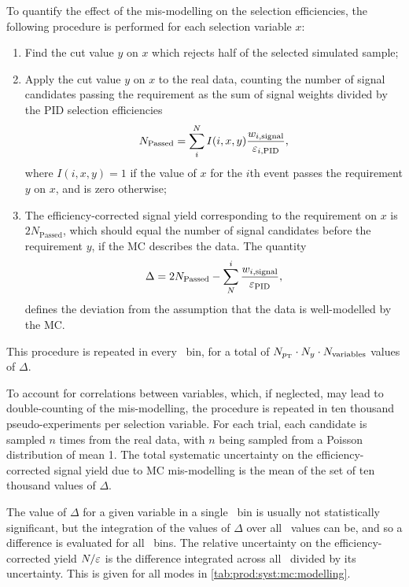 To quantify the effect of the mis-modelling on the selection efficiencies, the
following procedure is performed for each selection variable $x$:
\begin{enumerate}
  \item Find the cut value $y$ on $x$ which rejects half of the selected
    simulated sample;
  \item Apply the cut value $y$ on $x$ to the real data, counting the number of
    signal candidates passing the requirement as the sum of signal weights
    divided by the \ac{PID} selection efficiencies
    \begin{equation}
      N_{\text{Passed}} = \sum_{i}^{N} I(i, x, y) \frac{%
        w_{i,\text{signal}}
      }{%
        \eff_{i,\text{PID}}
      },
    \end{equation}
    where $I(i, x, y) = 1$ if the value of $x$ for the $i$th event passes the
    requirement $y$ on $x$, and is zero otherwise;
  \item The efficiency-corrected signal yield corresponding to the requirement
    on $x$ is $2N_{\text{Passed}}$, which should equal the number of signal
    candidates before the requirement $y$, if the \ac{MC} describes the data.
    The quantity
    \begin{equation}
      \Delta = 2N_{\text{Passed}} - \sum_{N}^{i} \frac{w_{i,\text{signal}}}{\varepsilon_{\textnormal{PID}}},
      \label{eqn:prod:syst:mc:eff_diff}
    \end{equation}
    defines the deviation from the assumption that the data is well-modelled by
    the \ac{MC}.
\end{enumerate}
This procedure is repeated in every \pTy\ bin, for a total of $N_{p_{\textnormal{T}}} \cdot
N_{y} \cdot N_{\text{variables}}$ values of $\Delta$.

To account for correlations between variables, which, if neglected, may lead to
double-counting of the mis-modelling, the procedure is repeated in ten thousand
pseudo-experiments per selection variable.
For each trial, each candidate is sampled $n$ times from the real data, with
$n$ being sampled from a Poisson distribution of mean 1.
The total systematic uncertainty on the efficiency-corrected signal yield due
to \ac{MC} mis-modelling is the mean of the set of ten thousand values of
$\Delta$.

The value of $\Delta$ for a given variable in a single \pTy\ bin is usually not
statistically significant, but the integration of the values of $\Delta$ over
all \pTy\ values can be, and so a difference is evaluated for all \pTy\ bins.
The relative uncertainty on the efficiency-corrected yield $N/\varepsilon$ is the
difference integrated across all \pTy\ divided by its uncertainty.
This is given for all modes in \cref{tab:prod:syst:mc:modelling}.


